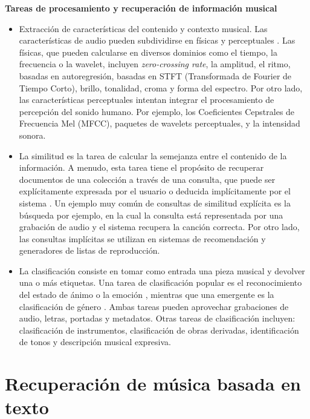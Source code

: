 \textbf{Tareas de procesamiento y recuperación de información musical}
\begin{itemize}
    \item Extracción de características del contenido y contexto musical. Las características de audio pueden subdividirse en físicas y perceptuales \cite{Alas2016ARO}. Las físicas, que pueden calcularse en diversos dominios como el tiempo, la frecuencia o la wavelet, incluyen \textit{zero-crossing rate}, la amplitud, el ritmo, basadas en autoregresión, basadas en STFT (Transformada de Fourier de Tiempo Corto), brillo, tonalidad, croma y forma del espectro. Por otro lado, las características perceptuales intentan integrar el procesamiento de percepción del sonido humano. Por ejemplo, los Coeficientes Cepstrales de Frecuencia Mel (MFCC), paquetes de wavelets perceptuales, y la intensidad sonora.
    \item La similitud es la tarea de calcular la semejanza entre el contenido de la información. A menudo, esta tarea tiene el propósito de recuperar documentos de una colección a través de una consulta, que puede ser explícitamente expresada por el usuario o deducida implícitamente por el sistema \cite{Simonetta2019MultimodalMI}. Un ejemplo muy común de consultas de similitud explícita es la búsqueda por ejemplo, en la cual la consulta está representada por una grabación de audio y el sistema recupera la canción correcta. Por otro lado, las consultas implícitas se utilizan en sistemas de recomendación y generadores de listas de reproducción.
    \item La clasificación consiste en tomar como entrada una pieza musical y devolver una o más etiquetas. Una tarea de clasificación popular es el reconocimiento del estado de ánimo o la emoción \cite{Kim2010StateOT}, mientras que una emergente es la clasificación de género \cite{Allamy20211DCA, AthulyaK2021DeepLB, Qiu2021DBTMPEDB, Rafi2021ComparativeAO, Koparde2021ASO, Ndou2021MusicGC, Prince2022MusicGC}. Ambas tareas pueden aprovechar grabaciones de audio, letras, portadas y metadatos. Otras tareas de clasificación incluyen: clasificación de instrumentos, clasificación de obras derivadas, identificación de tonos y descripción musical expresiva.
\end{itemize}

\section{Recuperación de música basada en texto}
\label{sec:text-based retrieval}

